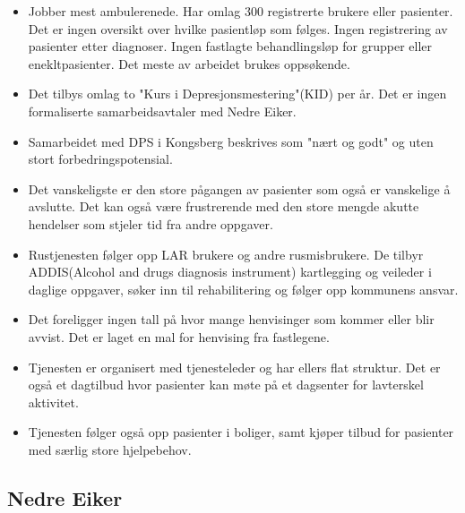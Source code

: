 \documentclass[11pt]{report} %
\begin{document}
                        \begin{itemize}
                    	      \item Jobber mest ambulerenede. Har omlag 300 registrerte brukere eller pasienter. Det er ingen oversikt over hvilke pasientløp som følges. Ingen registrering av pasienter etter  diagnoser. Ingen fastlagte behandlingsløp for grupper eller enekltpasienter. Det meste av arbeidet brukes oppsøkende. \\
                            \item Det tilbys omlag to "Kurs i Depresjonsmestering"(KID) per år. Det er ingen formaliserte samarbeidsavtaler med Nedre Eiker. \\
                            \item Samarbeidet med DPS i Kongsberg beskrives som "nært og godt" og uten stort forbedringspotensial.\\
                            \item Det vanskeligste er den store pågangen av pasienter som også er vanskelige å avslutte. Det kan også være frustrerende med den store mengde akutte hendelser som stjeler tid fra andre oppgaver.\\ 
                            \item Rustjenesten følger opp LAR brukere og andre rusmisbrukere. De tilbyr ADDIS(Alcohol and drugs diagnosis instrument) kartlegging og veileder i daglige oppgaver, søker inn til rehabilitering og følger opp kommunens ansvar.\\
                            \item Det foreligger ingen tall på hvor mange henvisinger som kommer eller blir avvist. Det er laget en mal for henvising fra fastlegene. \\
                            \item Tjenesten er organisert med tjenesteleder og har ellers flat struktur. Det er også et dagtilbud hvor pasienter kan møte på et dagsenter for lavterskel aktivitet. \\
                            \item Tjenesten følger også opp pasienter i boliger, samt kjøper tilbud for pasienter med særlig store hjelpebehov. \\
                        \end{itemize}
                    

                  \subsection{Nedre Eiker}\label{sec:org_nek}
\end{document}
